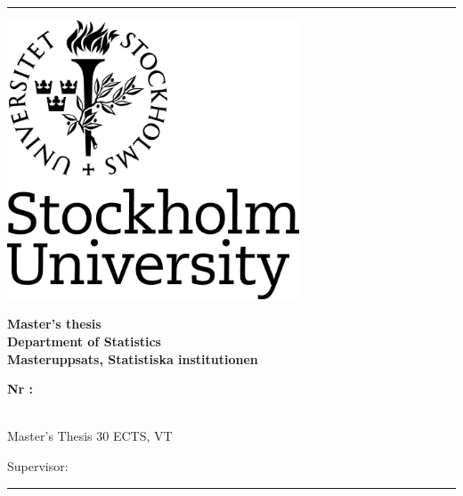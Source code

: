 \makeatletter
\begin{titlepage}
  \begin{center}
   	\rule{\textwidth}{2pt}
   	{\selectfont
   	
   	\begin{minipage}{0.35\textwidth}
   	  \vspace{0.2cm}
   	  \includegraphics[width=0.65\textwidth]{cover/su_logo}
   	\end{minipage}\begin{minipage}{0.65\textwidth}
   	  \begin{flushright}
   		{\fontsize{40}{50} \textbf{Master's thesis}}\\
   		\vspace{0.4cm}
   		{\huge \textbf{Department of Statistics}}\\
   		\vspace{0.4cm}   		
   		{\large \textbf{Masteruppsats, Statistiska institutionen}}
   	  \end{flushright}
   	\end{minipage}
   
      \vspace*{2cm}
      
      \begin{flushright}
        {\fontsize{18}{22}\textbf{Nr \thesisyear:\thesisnumber}}\\
        
        \vspace*{2cm}
        {\fontsize{24}{30}\textbf{\@title}}\\
        
        \vspace{0.8cm}
        {\fontsize{18}{22}\textbf{\@author}}
      \end{flushright}
       	       
      \vfill
      
      \begin{flushleft}
        {\Large Master's Thesis 30 ECTS, VT \thesisyear
        	
        Supervisor: \supervisor }
      \end{flushleft}
    }       
    \rule{\textwidth}{2pt}
  \end{center}
\end{titlepage}
